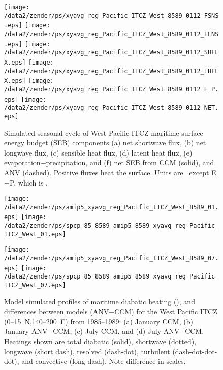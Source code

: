 \documentclass[twocolumn,final]{article}
\begin{document}
\begin{figure}
\begin{center}
\texttt{[image: /data2/zender/ps/xyavg\_reg\_Pacific\_ITCZ\_West\_8589\_0112\_FSNS.eps]}\vfill
\texttt{[image: /data2/zender/ps/xyavg\_reg\_Pacific\_ITCZ\_West\_8589\_0112\_FLNS.eps]}\vfill
\texttt{[image: /data2/zender/ps/xyavg\_reg\_Pacific\_ITCZ\_West\_8589\_0112\_SHFLX.eps]}\vfill
\texttt{[image: /data2/zender/ps/xyavg\_reg\_Pacific\_ITCZ\_West\_8589\_0112\_LHFLX.eps]}\vfill
\texttt{[image: /data2/zender/ps/xyavg\_reg\_Pacific\_ITCZ\_West\_8589\_0112\_E\_P.eps]}\vfill
\texttt{[image: /data2/zender/ps/xyavg\_reg\_Pacific\_ITCZ\_West\_8589\_0112\_NET.eps]}\vfill
\end{center}
\caption[Simulated seasonal cycle of West Pacific ITCZ 
maritime surface energy budget (SEB) components from CCM and ANV]{ 
Simulated seasonal cycle of West Pacific ITCZ 
maritime surface energy budget (SEB) components (a) net shortwave
flux, (b) net longwave flux, (c) sensible heat flux, (d) latent heat
flux, (e) evaporation$-$precipitation, and (f) net SEB from CCM
(solid), and ANV (dashed).  
Positive fluxes heat the surface.
Units are \wxmS\ except E$-$P, which is \mmxday.
\label{fig:xyavg_reg_Pacific_ITCZ_West_8589_0112_SEB}}   
\end{figure}
\clearpage

\begin{figure*}
\begin{center}
\texttt{[image: /data2/zender/ps/amip5\_xyavg\_reg\_Pacific\_ITCZ\_West\_8589\_01.eps]}%
\texttt{[image: /data2/zender/ps/spcp\_85\_8589\_amip5\_8589\_xyavg\_reg\_Pacific\_ITCZ\_West\_01.eps]}%

\texttt{[image: /data2/zender/ps/amip5\_xyavg\_reg\_Pacific\_ITCZ\_West\_8589\_07.eps]}%
\texttt{[image: /data2/zender/ps/spcp\_85\_8589\_amip5\_8589\_xyavg\_reg\_Pacific\_ITCZ\_West\_07.eps]}%
\end{center}
\caption[Model simulated profiles of maritime diabatic heating
and differences between models (ANV$-$CCM) for the
West Pacific ITCZ from 1985--1989]{
Model simulated profiles of maritime diabatic heating
(\kxday), and differences between models (ANV$-$CCM) for the
West Pacific ITCZ (0--15~\degreee N,140--200~\degreee E)
from 1985--1989: (a) January CCM, (b) January
ANV$-$CCM, (c) July 
CCM, and  (d) July ANV$-$CCM. 
Heatings shown are total diabatic (solid), shortwave (dotted),
longwave (short dash), resolved (dash-dot), turbulent
(dash-dot-dot-dot), and convective (long dash).
Note difference in scales.
\label{fig:xyavg_reg_Pacific_ITCZ_West_8589}}
\end{figure*}
\clearpage

 

\end{document}
